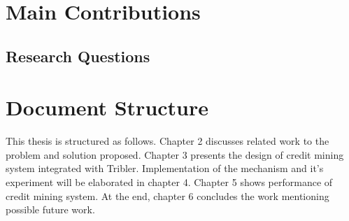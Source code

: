 
\section{Main Contributions}

\subsection{Research Questions}

\section{Document Structure}
This thesis is structured as follows. Chapter 2 discusses related work to the problem and solution proposed. Chapter 3 presents the design of credit mining system integrated with Tribler. Implementation of the mechanism and it's experiment will be elaborated in chapter 4. Chapter 5 shows performance of credit mining system. At the end, chapter 6 concludes the work mentioning possible future work.
